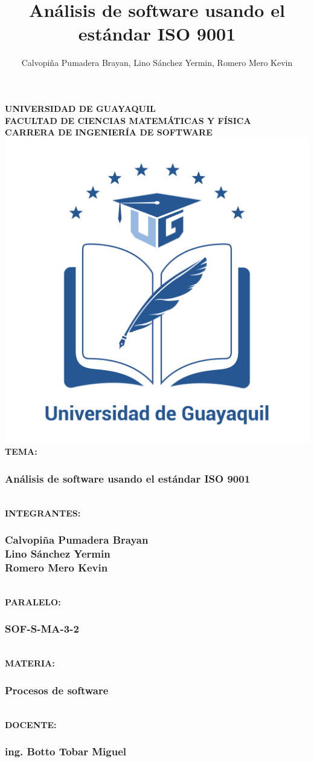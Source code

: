 \documentclass[12pt,a4paper]{ articule }
\author{Calvopiña Pumadera Brayan, Lino Sánchez Yermin, Romero Mero Kevin}
\title{Análisis de software usando el estándar ISO 9001}
\begin{document}
\begin{center}
\textbf{UNIVERSIDAD DE GUAYAQUIL\\
FACULTAD DE CIENCIAS MATEMÁTICAS Y FÍSICA\\
CARRERA DE INGENIERÍA DE SOFTWARE\\}
\includegraphics[scale=0.1]{ug.png} 
\textbf{\\TEMA:}
\subsubsection*{Análisis de software usando el estándar ISO 9001\\
}
\textbf{\\INTEGRANTES:}
\subsubsection*{Calvopiña Pumadera Brayan\\Lino Sánchez Yermin\\Romero Mero Kevin\\}
\textbf{\\PARALELO:}
\subsubsection*{SOF-S-MA-3-2\\}
\textbf{\\MATERIA:}
\subsubsection*{Procesos de software\\}
\textbf{\\DOCENTE:}
\subsubsection*{ing. Botto Tobar Miguel}
\end{center}
\newpage
\end{document}
